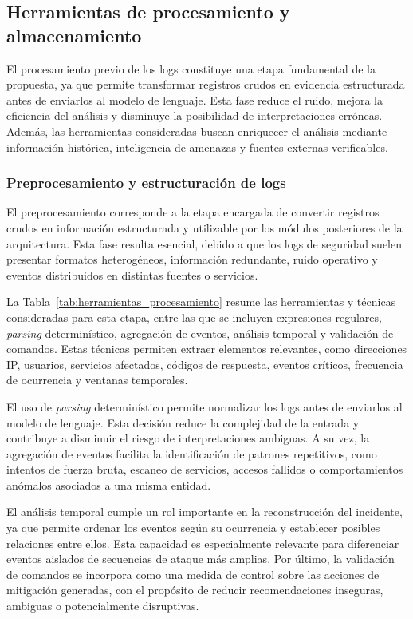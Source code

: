 \subsection{Herramientas de procesamiento y almacenamiento}

El procesamiento previo de los logs constituye una etapa fundamental de la propuesta, ya que permite transformar registros crudos en evidencia estructurada antes de enviarlos al modelo de lenguaje. Esta fase reduce el ruido, mejora la eficiencia del análisis y disminuye la posibilidad de interpretaciones erróneas. Además, las herramientas consideradas buscan enriquecer el análisis mediante información histórica, inteligencia de amenazas y fuentes externas verificables.

\subsubsection{Preprocesamiento y estructuración de logs}

El preprocesamiento corresponde a la etapa encargada de convertir registros crudos en información estructurada y utilizable por los módulos posteriores de la arquitectura. Esta fase resulta esencial, debido a que los logs de seguridad suelen presentar formatos heterogéneos, información redundante, ruido operativo y eventos distribuidos en distintas fuentes o servicios.

La Tabla~\ref{tab:herramientas_procesamiento} resume las herramientas y técnicas consideradas para esta etapa, entre las que se incluyen expresiones regulares, \textit{parsing }determinístico, agregación de eventos, análisis temporal y validación de comandos. Estas técnicas permiten extraer elementos relevantes, como direcciones IP, usuarios, servicios afectados, códigos de respuesta, eventos críticos, frecuencia de ocurrencia y ventanas temporales.

El uso de \textit{parsing }determinístico permite normalizar los logs antes de enviarlos al modelo de lenguaje. Esta decisión reduce la complejidad de la entrada y contribuye a disminuir el riesgo de interpretaciones ambiguas. A su vez, la agregación de eventos facilita la identificación de patrones repetitivos, como intentos de fuerza bruta, escaneo de servicios, accesos fallidos o comportamientos anómalos asociados a una misma entidad.

El análisis temporal cumple un rol importante en la reconstrucción del incidente, ya que permite ordenar los eventos según su ocurrencia y establecer posibles relaciones entre ellos. Esta capacidad es especialmente relevante para diferenciar eventos aislados de secuencias de ataque más amplias. Por último, la validación de comandos se incorpora como una medida de control sobre las acciones de mitigación generadas, con el propósito de reducir recomendaciones inseguras, ambiguas o potencialmente disruptivas.

